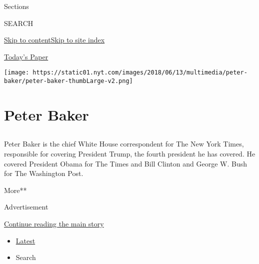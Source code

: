 Sections

SEARCH

\protect\hyperlink{site-content}{Skip to
content}\protect\hyperlink{site-index}{Skip to site index}

\href{https://myaccount.nytimes.com/auth/login?response_type=cookie\&client_id=vi}{}

\href{https://www.nytimes.com/section/todayspaper}{Today's Paper}

\texttt{[image: https://static01.nyt.com/images/2018/06/13/multimedia/peter-baker/peter-baker-thumbLarge-v2.png]}

\hypertarget{peter-baker}{%
\section{Peter Baker}\label{peter-baker}}

\hypertarget{section}{%
\subsection{}\label{section}}

Peter Baker is the chief White House correspondent for The New York
Times, responsible for covering President Trump, the fourth president he
has covered. He covered President Obama for The Times and Bill Clinton
and George W. Bush for The Washington Post.

More**

Advertisement

\protect\hyperlink{after-mid1}{Continue reading the main story}

\begin{itemize}
\tightlist
\item
  \protect\hyperlink{stream-panel}{Latest}
\item
  Search
\end{itemize}

